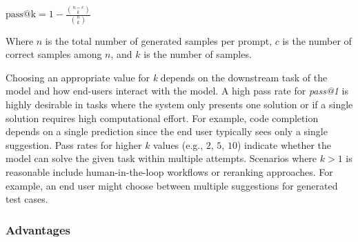 $\text{pass@k} = 1 - \frac{\binom{n-c}{k}}{\binom{n}{k}}$

Where $n$ is the total number of generated samples per prompt, $c$ is the number of correct samples among  $n$, and $k$ is the number of samples.

Choosing an appropriate value for \emph{k} depends on the downstream task of the model and how end-users interact with the model.
A high pass rate for \emph{pass@1} is highly desirable in tasks where the system only presents one solution or if a single solution requires high computational effort.
For example, code completion depends on a single prediction since the end user typically sees only a single suggestion.
Pass rates for higher $k$ values (e.g., $2$, $5$, $10$) indicate whether the model can solve the given task within multiple attempts.
Scenarios where $k>1$ is reasonable include human-in-the-loop workflows or reranking approaches.
For example, an end user might choose between multiple suggestions for generated test cases.





\subsubsection{Advantages}

